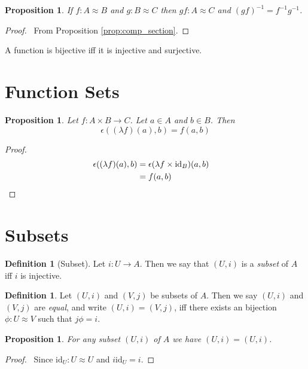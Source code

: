 \documentclass{book}
\let\qed\relax
\newtheorem{prop}[ax]{Proposition}
\theoremstyle{definition}
\newtheorem{df}[ax]{Definition}
\newcommand{\id}[1]{\ensuremath{\mathrm{id}_{#1}}}
\newcommand{\inv}[1]{\ensuremath{{#1}^{-1}}}
\begin{document}
\begin{prop}
If $f : A \approx B$ and $g : B \approx C$ then $gf : A \approx C$ and $\inv{(gf)} = \inv{f} \inv{g}$.
\end{prop}

\begin{proof}
\pf\ From Proposition \ref{prop:comp_section}. \qed
\end{proof}

A function is bijective iff it is injective and surjective.

\section{Function Sets}

\begin{prop}
Let $f : A \times B \rightarrow C$. Let $a \in A$ and $b \in B$. Then
\[ \epsilon((\lambda f)(a), b) = f(a,b) \]
\end{prop}

\begin{proof}
\pf
\begin{align*}
\epsilon((\lambda f)(a),b) & = \epsilon (\lambda f \times \id{B}) (a,b) \\
& = f(a,b) & \qed
\end{align*}
\end{proof}

\section{Subsets}

\begin{df}[Subset]
Let $i : U \rightarrow A$. Then we say that $(U,i)$ is a \emph{subset} of $A$ iff $i$ is injective.
\end{df}

\begin{df}
Let $(U,i)$ and $(V,j)$ be subsets of $A$. Then we say $(U,i)$ and $(V,j)$ are \emph{equal}, and write $(U,i) = (V,j)$, iff there exists an bijection $\phi : U \approx V$ such that $j \phi = i$.
\end{df}

\begin{prop}
For any subset $(U,i)$ of $A$ we have $(U,i) = (U,i)$.
\end{prop}

\begin{proof}
\pf\ Since $\id{U} : U \approx U$ and $i \id{U} = i$. \qed
\end{proof}
\end{document}
